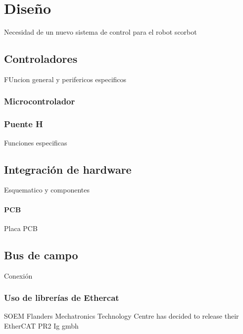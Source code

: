 \chapter{Diseño}

Necesidad de un nuevo sistema de control para el robot scorbot

\section{Controladores}

FUncion general y perifericos especificos

\subsection{Microcontrolador}



\subsection{Puente H}

Funciones especificas

\section{Integración de hardware}

Esquematico y componentes

\subsubsection{PCB}

Placa PCB

\section{Bus de campo}

Conexión

\subsection{Uso de librerías de Ethercat}

SOEM
Flanders Mechatronics Technology Centre has decided to release their EtherCAT PR2
Ig gmbh

